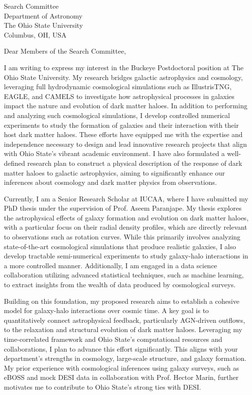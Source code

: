 \documentclass[11pt]{letter}
\begin{document}
\begin{letter}{Search Committee \\ Department of Astronomy \\ The Ohio State University \\ Columbus, OH, USA}

\opening{Dear Members of the Search Committee,}

I am writing to express my interest in the Buckeye Postdoctoral position at The Ohio State University. My research bridges galactic astrophysics and cosmology, leveraging full hydrodynamic cosmological simulations such as IllustrisTNG, EAGLE, and CAMELS to investigate how astrophysical processes in galaxies impact the nature and evolution of dark matter haloes. In addition to performing and analyzing such cosmological simulations, I develop controlled numerical experiments to study the formation of galaxies and their interaction with their host dark matter haloes. These efforts have equipped me with the expertise and independence necessary to design and lead innovative research projects that align with Ohio State's vibrant academic environment. I have also formulated a well-defined research plan to construct a physical description of the response of dark matter haloes to galactic astrophysics, aiming to significantly enhance our inferences about cosmology and dark matter physics from observations.

Currently, I am a Senior Research Scholar at IUCAA, where I have submitted my PhD thesis under the supervision of Prof. Aseem Paranjape. My thesis explores the astrophysical effects of galaxy formation and evolution on dark matter haloes, with a particular focus on their radial density profiles, which are directly relevant to observations such as rotation curves. While this primarily involves analyzing state-of-the-art cosmological simulations that produce realistic galaxies, I also develop tractable semi-numerical experiments to study galaxy-halo interactions in a more controlled manner. Additionally, I am engaged in a data science collaboration utilizing advanced statistical techniques, such as machine learning, to extract insights from the wealth of data produced by cosmological surveys.

Building on this foundation, my proposed research aims to establish a cohesive model for galaxy-halo interactions over cosmic time. A key goal is to quantitatively connect astrophysical feedback, particularly AGN-driven outflows, to the relaxation and structural evolution of dark matter haloes. Leveraging my time-correlated framework and Ohio State's computational resources and collaborations, I plan to advance this effort significantly. This aligns with your department's strengths in cosmology, large-scale structure, and galaxy formation. My prior experience with cosmological inferences using galaxy surveys, such as eBOSS and mock DESI data in collaboration with Prof. Hector Marin, further motivates me to contribute to Ohio State's strong ties with DESI.


\end{letter}
\end{document}
